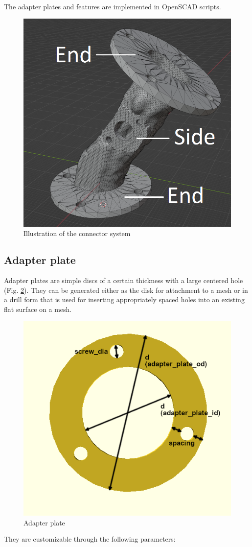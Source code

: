 \documentclass[MME,Projekt,english]{twbook}%
\begin{document}
The adapter plates and features are implemented in OpenSCAD scripts.

\begin{figure}[!htbp]
	\centering
	\includegraphics[width=.5\linewidth]{images/connector-system}
	\caption{Illustration of the connector system}\label{connector-system}
\end{figure}

\newpage
\subsection{Adapter plate}

Adapter plates are simple discs of a certain thickness with a large centered hole (Fig. \ref{adapter-plate}). They can be generated either as the disk
for attachment to a mesh or in a drill form that is used for inserting appropriately spaced holes into an existing flat surface on a mesh.

\begin{figure}[!htbp]
	\centering
	\includegraphics[width=.3\linewidth]{images/default_adapter.png}
	\caption{Adapter plate}\label{adapter-plate}
\end{figure}

\newpage

They are customizable through the following parameters:
\end{document}
